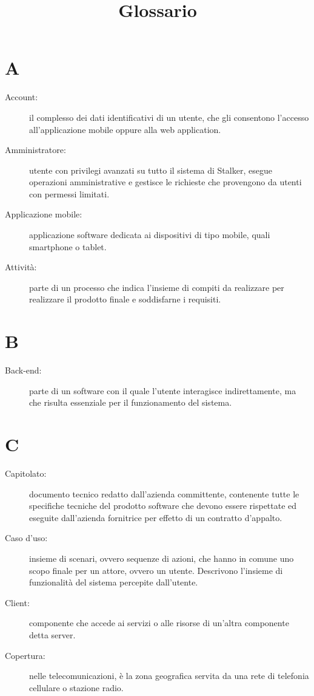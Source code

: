 \documentclass{article}
\title{Glossario}
\begin{document}


	\section{A}
	\begin{description}
		\item[Account:] il complesso dei dati identificativi di un utente, che gli consentono l'accesso all'applicazione mobile oppure alla web application.
		\item[Amministratore:] utente con privilegi avanzati su tutto il sistema di Stalker, esegue operazioni amministrative e gestisce le richieste che provengono da utenti con permessi limitati.
		\item[Applicazione mobile:] applicazione software dedicata ai dispositivi di tipo mobile, quali smartphone o tablet. 
		\item[Attività:] parte di un processo che indica l'insieme di compiti da realizzare per realizzare il prodotto finale e soddisfarne i requisiti.
	\end{description}
	\newpage
	\section{B}
	\begin{description}
		\item[Back-end:] parte di un software con il quale l'utente interagisce indirettamente, ma che risulta essenziale per il funzionamento del sistema.
	\end{description}
	\newpage
	\section{C}
	\begin{description}
		\item[Capitolato:] documento tecnico redatto dall'azienda committente, contenente tutte le specifiche tecniche del prodotto software che devono essere rispettate ed eseguite dall'azienda fornitrice per effetto di un contratto d'appalto.
		\item[Caso d'uso:] insieme di scenari, ovvero sequenze di azioni, che hanno in comune uno scopo finale per un attore, ovvero un utente. Descrivono l'insieme di funzionalità del sistema percepite dall'utente.
		\item[Client:] componente che accede ai servizi o alle risorse di un'altra componente detta server.
		\item[Copertura:] nelle telecomunicazioni, è la zona geografica servita da una rete di telefonia cellulare o stazione radio.
	\end{description}
	\newpage
\end{document}
